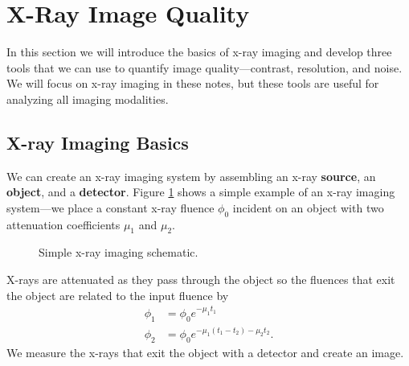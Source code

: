 \documentclass[mphy386-notes.tex]{subfiles}
\begin{document}
\section{X-Ray Image Quality}
In this section we will introduce the basics of x-ray imaging and develop three
tools that we can use to quantify image quality---contrast, resolution, and
noise. We will focus on x-ray imaging in these notes, but these tools are
useful for analyzing all imaging modalities.

\subsection{X-ray Imaging Basics}
We can create an x-ray imaging system by assembling an x-ray \textbf{source}, an
\textbf{object}, and a \textbf{detector}. Figure \ref{fig:simple} shows a simple
example of an x-ray imaging system---we place a constant x-ray fluence $\phi_0$
incident on an object with two attenuation coefficients $\mu_1$ and $\mu_2$.
\begin{figure}[h]
\begin{center}
\end{center}
\captionsetup{width=1.0\linewidth}
\caption{Simple x-ray imaging schematic.}
\label{fig:simple}
\end{figure}
X-rays are attenuated as they pass through the object so the fluences that
exit the object are related to the input fluence by
\begin{align}
  \phi_1 &= \phi_0e^{-\mu_1 t_1}\\
  \phi_2 &= \phi_0e^{-\mu_1(t_1 - t_2) - \mu_2t_2}. 
\end{align}
We measure the x-rays that exit the object with a detector and create an image.
\end{document}
